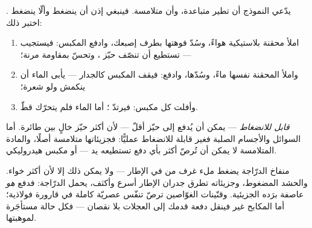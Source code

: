 \begin{method}[محقنتان]\label{met:g7:states-of-matter:syringe}
يدّعي النموذج أن   تطير متباعدة، وأن  
متلامسة. فينبغي إذن أن ينضغط  وألّا ينضغط . اختبر
ذلك:
\begin{enumerate}
  \item املأ محقنة بلاستيكية هواءً، وسُدّ فوهتها بطرف إصبعك،
        وادفع المكبس: فيستجيب --- تستطيع أن تنصّف حيّز ،
        وتحسّ بمقاومة مرنة؛
  \item واملأ المحقنة نفسها ماءً، وسُدّها، وادفع: فيقف المكبس
        كالجدار --- يأبى الماء أن ينكمش ولو شعرة؛
  \item وأفلت كل مكبس: فيرتدّ ؛ أما الماء فلم يتحرّك
        قطّ.
\end{enumerate}
\end{method}

\begin{proposition}\label{prop:g7:states-of-matter:squeeze}
 \emph{قابل للانضغاط} --- يمكن أن
يُدفع إلى حيّز أقلّ --- لأن أكثر  حيّز خالٍ بين 
طائرة. أما السوائل والأجسام الصلبة فغير قابلة للانضغاط عمليًّا:
فجزيئاتها متلامسة أصلًا، والمادة المتلامسة لا يمكن أن تُرصّ
أكثر بأي دفع تستطيعه يد --- أو مكبس هيدروليكي.
\end{proposition}

\begin{example}\label{ex:g7:states-of-matter:squeezed}
منفاخ الدرّاجة يضغط ملء غرف من  في الإطار --- ولا يمكن
ذلك إلا لأن أكثر  خواء. والحشد المضغوط، وجزيئاته تطرق
جدران الإطار أسرع وأكثف، يحمل الدرّاجة: فدفع  \emph{هو}
عاصفة برَده الجزيئية. وقنّينات الغوّاصين ترصّ تنفّس عصريّة
كاملة في قارورة فولاذية؛ أما  المكابح غير 
فينقل دفعة قدمك إلى العجلات بلا نقصان --- فكل حالة مستأجَرة
لموهبتها.
\end{example}

